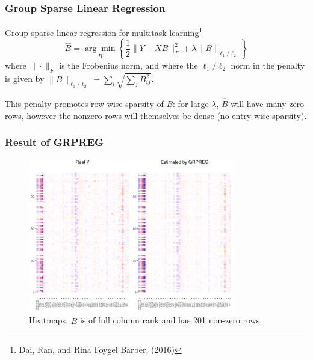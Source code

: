\begin{frame}\frametitle{Group Sparse Linear Regression}
    Group sparse linear regression for multitask learning\footnote[1]{Dai, Ran, and Rina Foygel Barber. (2016)}
    \begin{equation}
        \widehat{B}=\underset{B}{\arg \min }\left\{\frac{1}{2}\|Y-X B\|_{F}^{2}+\lambda\|B\|_{\ell_{1} / \ell_{2}}\right\}
    \end{equation}
    where $\|\cdot\|_{F}$ is the Frobenius norm,%
    and where the $\ell_1/\ell_2$ norm in the penalty is given by
    $\|B\|_{\ell_1/\ell_2} = \sum_i \sqrt{\sum_j B_{ij}^2}$.

    This penalty promotes row-wise sparsity of $B$: for large $\lambda$, $\widehat{B}$ will have many zero rows, however the nonzero rows will
    themselves be dense (no entry-wise sparsity).
\end{frame}

\begin{frame}
    \frametitle{Result of GRPREG}
    \begin{figure}[h]
        \centering
        \includegraphics[width=0.8\textwidth]{./figs/heatmap_grpreg.pdf}
        \caption{Heatmaps. $\widehat{B}$ is of full column rank and has 201 non-zero rows.}
    \end{figure}
\end{frame}


